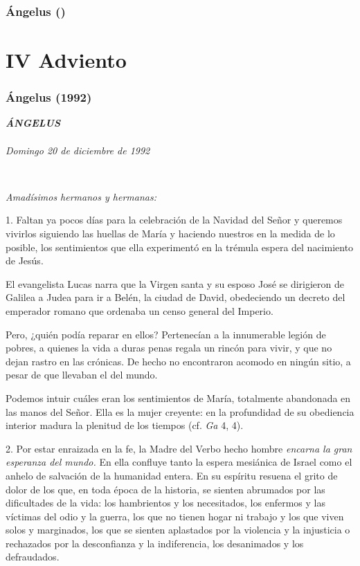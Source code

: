 \subsubsection{Ángelus ()}

\section{IV Adviento} \subsubsection{Ángelus (1992)} \emph{\textbf{ÁNGELUS\\ }\\ Domingo 20 de diciembre de 1992}

~

\emph{Amadísimos hermanos y hermanas:}

1. Faltan ya pocos días para la celebración de la Navidad del Señor y queremos vivirlos siguiendo las huellas de María y haciendo nuestros en la medida de lo posible, los sentimientos que ella experimentó en la trémula espera del nacimiento de Jesús.

El evangelista Lucas narra que la Virgen santa y su esposo José se dirigieron de Galilea a Judea para ir a Belén, la ciudad de David, obedeciendo un decreto del emperador romano que ordenaba un censo general del Imperio.

Pero, ¿quién podía reparar en ellos? Pertenecían a la innumerable legión de pobres, a quienes la vida a duras penas regala un rincón para vivir, y que no dejan rastro en las crónicas. De hecho no encontraron acomodo en ningún sitio, a pesar de que llevaban el  del mundo.

Podemos intuir cuáles eran los sentimientos de María, totalmente abandonada en las manos del Señor. Ella es la mujer creyente: en la profundidad de su obediencia interior madura la plenitud de los tiempos (cf. \emph{Ga} 4, 4).

2. Por estar enraizada en la fe, la Madre del Verbo hecho hombre \emph{encarna la gran esperanza del mundo.} En ella confluye tanto la espera mesiánica de Israel como el anhelo de salvación de la humanidad entera. En su espíritu resuena el grito de dolor de los que, en toda época de la historia, se sienten abrumados por las dificultades de la vida: los hambrientos y los necesitados, los enfermos y las víctimas del odio y la guerra, los que no tienen hogar ni trabajo y los que viven solos y marginados, los que se sienten aplastados por la violencia y la injusticia o rechazados por la desconfianza y la indiferencia, los desanimados y los defraudados.


